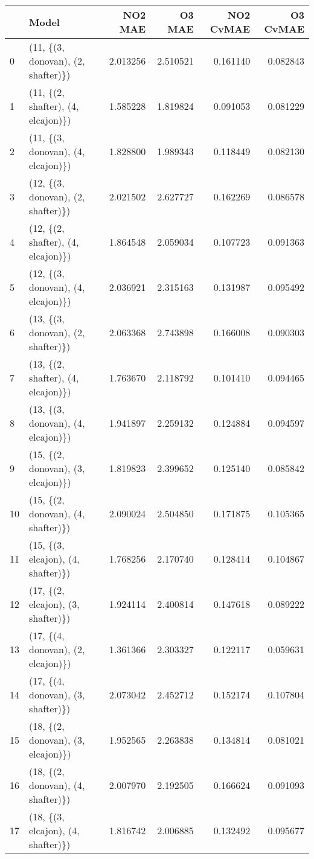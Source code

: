\begin{tabular}{llrrrr}
\toprule
{} &                               Model &   NO2 MAE &    O3 MAE &  NO2 CvMAE &  O3 CvMAE \\
\midrule
0  &  (11, \{(3, donovan), (2, shafter)\}) &  2.013256 &  2.510521 &   0.161140 &  0.082843 \\
1  &  (11, \{(2, shafter), (4, elcajon)\}) &  1.585228 &  1.819824 &   0.091053 &  0.081229 \\
2  &  (11, \{(3, donovan), (4, elcajon)\}) &  1.828800 &  1.989343 &   0.118449 &  0.082130 \\
3  &  (12, \{(3, donovan), (2, shafter)\}) &  2.021502 &  2.627727 &   0.162269 &  0.086578 \\
4  &  (12, \{(2, shafter), (4, elcajon)\}) &  1.864548 &  2.059034 &   0.107723 &  0.091363 \\
5  &  (12, \{(3, donovan), (4, elcajon)\}) &  2.036921 &  2.315163 &   0.131987 &  0.095492 \\
6  &  (13, \{(3, donovan), (2, shafter)\}) &  2.063368 &  2.743898 &   0.166008 &  0.090303 \\
7  &  (13, \{(2, shafter), (4, elcajon)\}) &  1.763670 &  2.118792 &   0.101410 &  0.094465 \\
8  &  (13, \{(3, donovan), (4, elcajon)\}) &  1.941897 &  2.259132 &   0.124884 &  0.094597 \\
9  &  (15, \{(2, donovan), (3, elcajon)\}) &  1.819823 &  2.399652 &   0.125140 &  0.085842 \\
10 &  (15, \{(2, donovan), (4, shafter)\}) &  2.090024 &  2.504850 &   0.171875 &  0.105365 \\
11 &  (15, \{(3, elcajon), (4, shafter)\}) &  1.768256 &  2.170740 &   0.128414 &  0.104867 \\
12 &  (17, \{(2, elcajon), (3, shafter)\}) &  1.924114 &  2.400814 &   0.147618 &  0.089222 \\
13 &  (17, \{(4, donovan), (2, elcajon)\}) &  1.361366 &  2.303327 &   0.122117 &  0.059631 \\
14 &  (17, \{(4, donovan), (3, shafter)\}) &  2.073042 &  2.452712 &   0.152174 &  0.107804 \\
15 &  (18, \{(2, donovan), (3, elcajon)\}) &  1.952565 &  2.263838 &   0.134814 &  0.081021 \\
16 &  (18, \{(2, donovan), (4, shafter)\}) &  2.007970 &  2.192505 &   0.166624 &  0.091093 \\
17 &  (18, \{(3, elcajon), (4, shafter)\}) &  1.816742 &  2.006885 &   0.132492 &  0.095677 \\

\end{tabular}
